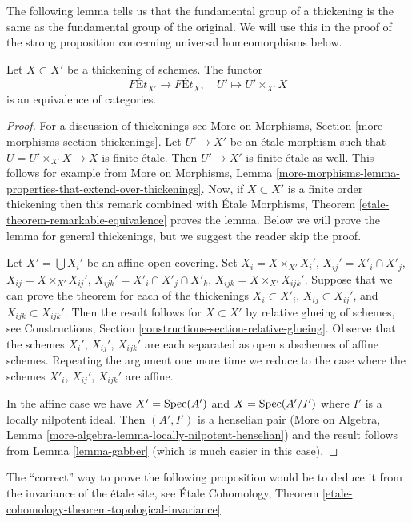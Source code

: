 \noindent
The following lemma tells us that the fundamental group of a thickening
is the same as the fundamental group of the original. We will use this
in the proof of the strong proposition concerning universal homeomorphisms
below.

\begin{lemma}
\label{lemma-thickening}
Let $X \subset X'$ be a thickening of schemes. The functor
$$
\textit{F\'Et}_{X'} \longrightarrow \textit{F\'Et}_X,\quad
U' \longmapsto U' \times_{X'} X
$$
is an equivalence of categories.
\end{lemma}

\begin{proof}
For a discussion of thickenings see
More on Morphisms, Section \ref{more-morphisms-section-thickenings}.
Let $U' \to X'$ be an \'etale morphism such that $U = U' \times_{X'} X \to X$
is finite \'etale. Then $U' \to X'$ is finite \'etale as well.
This follows for example from More on Morphisms, Lemma
\ref{more-morphisms-lemma-properties-that-extend-over-thickenings}.
Now, if $X \subset X'$ is a finite order thickening then this remark
combined with \'Etale Morphisms, Theorem
\ref{etale-theorem-remarkable-equivalence}
proves the lemma. Below we will prove the lemma for general thickenings, but
we suggest the reader skip the proof.

\medskip\noindent
Let $X' = \bigcup X_i'$ be an affine open covering. Set
$X_i = X \times_{X'} X_i'$, $X_{ij}' = X'_i \cap X'_j$,
$X_{ij} = X \times_{X'} X_{ij}'$, $X_{ijk}' = X'_i \cap X'_j \cap X'_k$,
$X_{ijk} = X \times_{X'} X_{ijk}'$.
Suppose that we can prove
the theorem for each of the thickenings
$X_i \subset X'_i$, $X_{ij} \subset X_{ij}'$, and $X_{ijk} \subset X_{ijk}'$.
Then the result follows for $X \subset X'$ by relative glueing of
schemes, see
Constructions, Section \ref{constructions-section-relative-glueing}.
Observe that the schemes $X_i'$, $X_{ij}'$, $X_{ijk}'$ are
each separated as open subschemes of affine schemes. Repeating the
argument one more time we reduce to the case where the schemes
$X'_i$, $X_{ij}'$, $X_{ijk}'$ are affine.

\medskip\noindent
In the affine case we have $X' = \mathop{\mathrm{Spec}}(A')$ and $X = \mathop{\mathrm{Spec}}(A'/I')$
where $I'$ is a locally nilpotent ideal. Then $(A', I')$ is a
henselian pair (More on Algebra, Lemma
\ref{more-algebra-lemma-locally-nilpotent-henselian})
and the result follows from Lemma \ref{lemma-gabber} (which is
much easier in this case).
\end{proof}

\noindent
The ``correct'' way to prove the following proposition would be to
deduce it from the invariance of the \'etale site, see
\'Etale Cohomology, Theorem
\ref{etale-cohomology-theorem-topological-invariance}.

